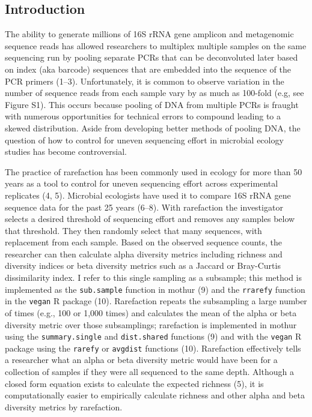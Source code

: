 \documentclass[
]{article}
\begin{document}
\newpage

\hypertarget{introduction}{%
\subsection{Introduction}\label{introduction}}

The ability to generate millions of 16S rRNA gene amplicon and
metagenomic sequence reads has allowed researchers to multiplex multiple
samples on the same sequencing run by pooling separate PCRs that can be
deconvoluted later based on index (aka barcode) sequences that are
embedded into the sequence of the PCR primers (1--3). Unfortunately, it
is common to observe variation in the number of sequence reads from each
sample vary by as much as 100-fold (e.g, see Figure S1). This occurs
because pooling of DNA from multiple PCRs is fraught with numerous
opportunities for technical errors to compound leading to a skewed
distribution. Aside from developing better methods of pooling DNA, the
question of how to control for uneven sequencing effort in microbial
ecology studies has become controversial.

The practice of rarefaction has been commonly used in ecology for more
than 50 years as a tool to control for uneven sequencing effort across
experimental replicates (4, 5). Microbial ecologists have used it to
compare 16S rRNA gene sequence data for the past 25 years (6--8). With
rarefaction the investigator selects a desired threshold of sequencing
effort and removes any samples below that threshold. They then randomly
select that many sequences, with replacement from each sample. Based on
the observed sequence counts, the researcher can then calculate alpha
diversity metrics including richness and diversity indices or beta
diversity metrics such as a Jaccard or Bray-Curtis dissimilarity index.
I refer to this single sampling as a subsample; this method is
implemented as the \texttt{sub.sample} function in mothur (9) and the
\texttt{rrarefy} function in the \texttt{vegan} R package (10).
Rarefaction repeats the subsampling a large number of times (e.g., 100
or 1,000 times) and calculates the mean of the alpha or beta diversity
metric over those subsamplings; rarefaction is implemented in mothur
using the \texttt{summary.single} and \texttt{dist.shared} functions (9)
and with the \texttt{vegan} R package using the \texttt{rarefy} or
\texttt{avgdist} functions (10). Rarefaction effectively tells a
researcher what an alpha or beta diversity metric would have been for a
collection of samples if they were all sequenced to the same depth.
Although a closed form equation exists to calculate the expected
richness (5), it is computationally easier to empirically calculate
richness and other alpha and beta diversity metrics by rarefaction.
\end{document}
